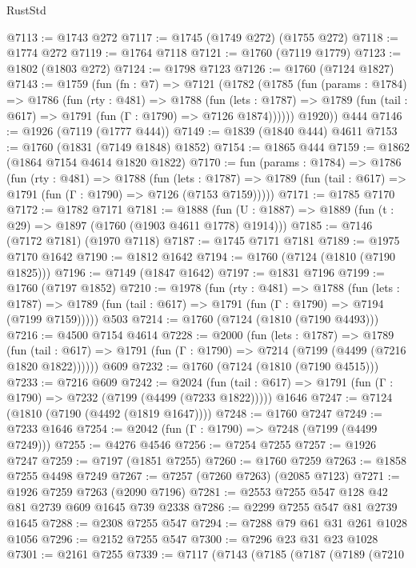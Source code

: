 \begin{lexlean}{RustStd}
\begin{coremodule}
@7113 := @1743 @272
@7117 := @1745 (@1749 @272) (@1755 @272)
@7118 := @1774 @272
@7119 := @1764 @7118
@7121 := @1760 (@7119 @1779)
@7123 := @1802 (@1803 @272)
@7124 := @1798 @7123
@7126 := @1760 (@7124 @1827)
@7143 := @1759
    (fun (fn : @7) =>
    @7121
      (@1782
        (@1785
          (fun (params : @1784) =>
          @1786
            (fun (rty : @481) =>
            @1788
              (fun (lets : @1787) =>
              @1789 (fun (tail : @617) => @1791 (fun (Γ : @1790) => @7126 @1874))))))
        @1920))
    @444
@7146 := @1926 (@7119 (@1777 @444))
@7149 := @1839 (@1840 @444) @4611
@7153 := @1760 (@1831 (@7149 @1848) @1852)
@7154 := @1865 @444
@7159 := @1862 (@1864 @7154 @4614 @1820 @1822)
@7170 := fun (params : @1784) =>
  @1786
    (fun (rty : @481) =>
    @1788
      (fun (lets : @1787) =>
      @1789 (fun (tail : @617) => @1791 (fun (Γ : @1790) => @7126 (@7153 @7159)))))
@7171 := @1785 @7170
@7172 := @1782 @7171
@7181 := @1888 (fun (U : @1887) => @1889 (fun (t : @29) => @1897 (@1760 (@1903 @4611 @1778) @1914)))
@7185 := @7146 (@7172 @7181) (@1970 @7118)
@7187 := @1745 @7171 @7181
@7189 := @1975 @7170 @1642
@7190 := @1812 @1642
@7194 := @1760 (@7124 (@1810 (@7190 @1825)))
@7196 := @7149 (@1847 @1642)
@7197 := @1831 @7196
@7199 := @1760 (@7197 @1852)
@7210 := @1978
    (fun (rty : @481) =>
    @1788
      (fun (lets : @1787) =>
      @1789 (fun (tail : @617) => @1791 (fun (Γ : @1790) => @7194 (@7199 @7159)))))
    @503
@7214 := @1760 (@7124 (@1810 (@7190 @4493)))
@7216 := @4500 @7154 @4614
@7228 := @2000
    (fun (lets : @1787) =>
    @1789
      (fun (tail : @617) => @1791 (fun (Γ : @1790) => @7214 (@7199 (@4499 (@7216 @1820 @1822))))))
    @609
@7232 := @1760 (@7124 (@1810 (@7190 @4515)))
@7233 := @7216 @609
@7242 := @2024
    (fun (tail : @617) => @1791 (fun (Γ : @1790) => @7232 (@7199 (@4499 (@7233 @1822)))))
    @1646
@7247 := @7124 (@1810 (@7190 (@4492 (@1819 @1647))))
@7248 := @1760 @7247
@7249 := @7233 @1646
@7254 := @2042 (fun (Γ : @1790) => @7248 (@7199 (@4499 @7249)))
@7255 := @4276 @4546
@7256 := @7254 @7255
@7257 := @1926 @7247
@7259 := @7197 (@1851 @7255)
@7260 := @1760 @7259
@7263 := @1858 @7255 @4498 @7249
@7267 := @7257 (@7260 @7263) (@2085 @7123)
@7271 := @1926 @7259 @7263 (@2090 @7196)
@7281 := @2553 @7255 @547 @128 @42 @81 @2739 @609 @1645 @739 @2338
@7286 := @2299 @7255 @547 @81 @2739 @1645
@7288 := @2308 @7255 @547
@7294 := @7288 @79 @61 @31 @261 @1028 @1056
@7296 := @2152 @7255 @547
@7300 := @7296 @23 @31 @23 @1028
@7301 := @2161 @7255
@7339 := @7117
    (@7143
      (@7185
        (@7187
          (@7189
            (@7210

\end{coremodule}
\end{lexlean}
